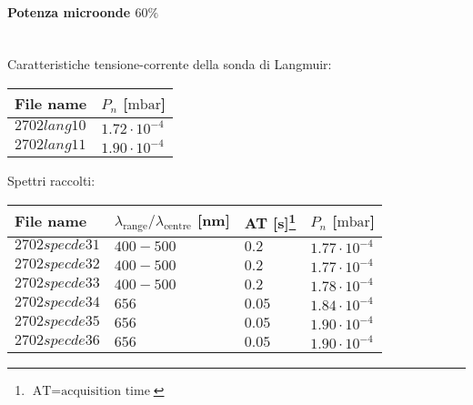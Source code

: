 \paragraph*{Potenza microonde $\text{60\%}$} ~\\
Caratteristiche tensione-corrente della sonda di Langmuir:
\begin{center}
\begin{tabular}{p{3cm}p{3cm}}
\toprule
File name	&$P_n$ [$\si{\milli\bar}$]\\
\midrule
$2702lang10$	&$1.72\cdot10^{-4}$\\
$2702lang11$	&$1.90\cdot10^{-4}$\\
\bottomrule
\end{tabular}
\end{center}

Spettri raccolti:
\begin{center}
\begin{tabular}{p{3cm}p{4cm}p{2cm}p{3cm}}
\toprule
File name	&$\lambda_\text{range}\text{/}\lambda_\text{centre}$ [nm] 	&AT [s]\footnote{$\text{AT}=\text{acquisition time}$} &$P_n$ [$\si{\milli\bar}$]\\
\midrule
$2702specde31$	&$400-500$	&$0.2$		&$1.77\cdot10^{-4}$\\
$2702specde32$	&$400-500$	&$0.2$		&$1.77\cdot10^{-4}$\\
$2702specde33$	&$400-500$	&$0.2$		&$1.78\cdot10^{-4}$\\
$2702specde34$	&$656$		&$0.05$		&$1.84\cdot10^{-4}$\\
$2702specde35$	&$656$		&$0.05$		&$1.90\cdot10^{-4}$\\
$2702specde36$	&$656$		&$0.05$		&$1.90\cdot10^{-4}$\\
\bottomrule
\end{tabular}
\end{center}